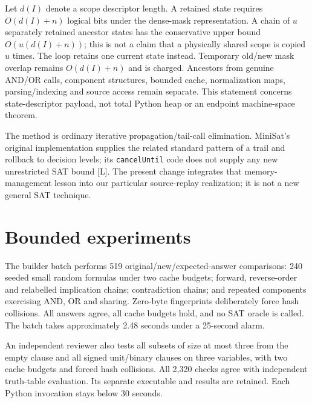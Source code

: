\documentclass[11pt]{article}
\begin{document}
Let $d(I)$ denote a scope descriptor length. A retained state requires
$O(d(I)+n)$ logical bits under the dense-mask representation.
A chain of $u$ separately retained ancestor states has the conservative
upper bound $O(u(d(I)+n))$; this is not a claim that a physically shared
scope is copied $u$ times. The loop retains one current state instead.
Temporary old/new mask overlap remains $O(d(I)+n)$ and is charged.
Ancestors from genuine AND/OR calls, component structures, bounded cache,
normalization maps, parsing/indexing and source access remain separate.
This statement concerns state-descriptor payload, not total Python heap
or an endpoint machine-space theorem.

The method is ordinary iterative propagation/tail-call elimination.
MiniSat's original implementation supplies the related standard pattern of
a trail and rollback to decision levels; its \texttt{cancelUntil} code
does not supply any new unrestricted SAT bound [L]. The present change
integrates that memory-management lesson into our particular source-replay
realization; it is not a new general SAT technique.

\section{Bounded experiments}
The builder batch performs 519 original/new/expected-answer comparisons:
240 seeded small random formulas under two cache budgets; forward,
reverse-order and relabelled implication chains; contradiction chains;
and repeated components exercising AND, OR and sharing.
Zero-byte fingerprints deliberately force hash collisions.
All answers agree, all cache budgets hold, and no SAT oracle is called.
The batch takes approximately 2.48 seconds under a 25-second alarm.

An independent reviewer also tests all subsets of size at most three from
the empty clause and all signed unit/binary clauses on three variables,
with two cache budgets and forced hash collisions. All 2,320 checks agree
with independent truth-table evaluation. Its separate executable and
results are retained. Each Python invocation stays below 30 seconds.
\end{document}
